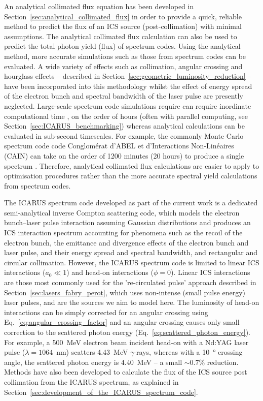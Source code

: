 \documentclass[../main.tex]{subfiles}
\begin{document}
An analytical collimated flux equation has been developed in Section~\ref{sec:analytical_collimated_flux} in order to provide a quick, reliable method to predict the flux of an ICS source (post-collimation) with minimal assumptions. The analytical collimated flux calculation can also be used to predict the total photon yield (flux) of spectrum codes. Using the analytical method, more accurate simulations such as those from spectrum codes can be evaluated. A wide variety of effects such as collimation, angular crossing and hourglass effects -- described in Section~\ref{sec:geometric_luminosity_reduction} -- have been incorporated into this methodology whilst the effect of energy spread of the electron bunch and spectral bandwidth of the laser pulse are presently neglected. Large-scale spectrum code simulations require can require inordinate computational time \cite{ranjan2018simulation}, on the order of hours (often with parallel computing, see Section~\ref{sec:ICARUS_benchmarking}) whereas analytical calculations can be evaluated in sub-second timescales. For example, the commonly Monte Carlo spectrum code code  Conglom\'{e}rat d'ABEL et d'Interactions Non-Lin\'{e}aires (\textsc{CAIN}) \cite{chen1995cain} can take on the order of 1200 minutes (20 hours) to produce a single spectrum \cite{sun2011theoretical}. Therefore, analytical collimated flux calculations are easier to apply to optimisation procedures rather than the more accurate spectral yield calculations from spectrum codes.

The \textsc{ICARUS} spectrum code developed as part of the current work is a dedicated semi-analytical inverse Compton scattering code, which models the electron bunch--laser pulse interaction assuming Gaussian distributions and produces an ICS interaction spectrum
accounting for phenomena such as the recoil of the electron bunch, the emittance and divergence effects of the electron bunch and laser pulse, and their energy spread and spectral bandwidth, and rectangular and circular collimation. However, the \textsc{ICARUS} spectrum code is limited to linear ICS interactions ($a_{0} \ll 1$) and head-on interactions ($\phi=0$). Linear ICS interactions are those most commonly used for the 're-circulated pulse' approach described in Section~\ref{sec:lasers_fabry_perot}, which uses non-intense (small pulse energy) laser pulses, and are the sources we aim to model here. The luminosity of head-on interactions can be simply corrected for an angular crossing using Eq.~\ref{eq:angular_crossing_factor} and an angular crossing causes only small correction to the scattered photon energy (Eq.~\ref{eq:scattered_photon_energy}). For example, a  500~\si{\mega\electronvolt} electron beam incident head-on with a Nd:YAG laser pulse ($\lambda = 1064$~\si{\nano\meter}) scatters 4.43~\si{\mega\electronvolt} $\gamma$-rays, whereas with a 10~\si{\degree} crossing angle, the scattered photon energy is 4.40~\si{\mega\electronvolt} -- a small $\sim0.7$\% reduction. Methods have also been developed to calculate the flux of the ICS source post collimation from the \textsc{ICARUS} spectrum, as explained in Section~\ref{sec:development_of_the_ICARUS_spectrum_code}. 
\end{document}

